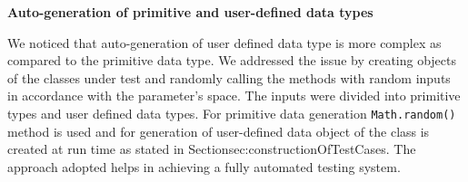 \textbf{Auto-generation of primitive and user-defined data types}

We noticed that auto-generation of user defined data type is more complex as compared to the primitive data type. We addressed the issue by creating objects of the classes under test and randomly calling the methods with random inputs in accordance with the parameter's space. The inputs were divided into primitive types and user defined data types.  For primitive data generation \verb+Math.random()+ method is used and for generation of user-defined data object of the class is created at run time as stated in Section{sec:constructionOfTestCases}. The approach adopted helps in achieving a fully automated testing system.\\












